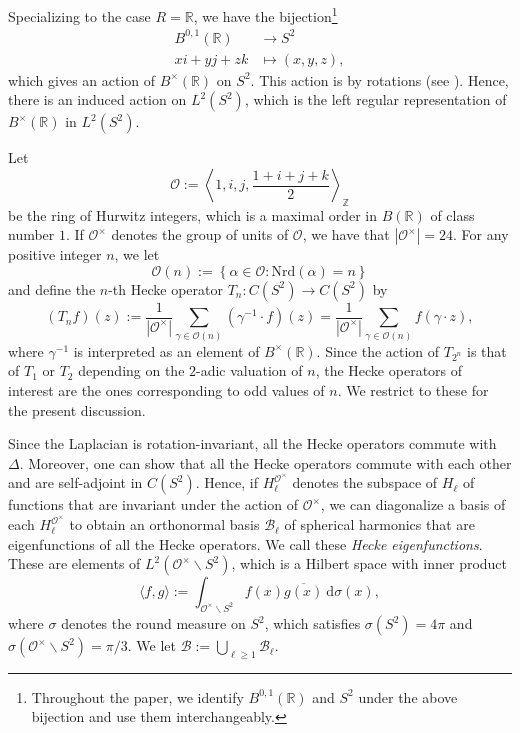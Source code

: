\documentclass[11pt]{amsart}
\theoremstyle{definition}
\begin{document}
Specializing to the case $R=\mathbb{R}$, we have the bijection\footnote{Throughout the paper, we identify $B^{0,1}(\mathbb{R})$ and $S^2$ under the above bijection and use them interchangeably.}
\begin{align*}
    B^{0,1}(\mathbb{R}) &\longrightarrow S^2 \\
    xi+yj+zk &\longmapsto (x,y,z),
\end{align*}
which gives an action of $B^{\times}(\mathbb{R})$ on $S^2$. This action is by rotations (see \cite[\S 3.1]{ConwaySmith}). Hence, there is an induced action on $L^2(S^2)$, which is the left regular representation of $B^{\times}(\mathbb{R})$ in $L^2(S^2)$. 

Let $$\mathcal{O} := \left\langle 1,i,j,\frac{1+i+j+k}{2}\right\rangle_{\mathbb{Z}}$$ be the ring of Hurwitz integers, which is a maximal order in $B(\mathbb{R})$ of class number $1$. If $\mathcal{O}^{\times}$ denotes the group of units of $\mathcal{O}$, we have that $|\mathcal{O}^{\times}| = 24$. For any positive integer $n$, we let $$ \mathcal{O}(n) := \left\{ \alpha \in \mathcal{O} : \mathrm{Nrd}(\alpha) = n \right\}$$ and define the $n$-th Hecke operator $T_n : C(S^2) \rightarrow C(S^2)$ by $$ (T_n f)(z) := \frac{1}{|\mathcal{O}^{\times}|}\sum_{\gamma \in \mathcal{O}(n)} (\gamma^{-1} \cdot f)(z) = \frac{1}{|\mathcal{O}^{\times}|}\sum_{\gamma \in \mathcal{O}(n)} f(\gamma \cdot z),$$ where $\gamma^{-1}$ is interpreted as an element of $B^{\times}(\mathbb{R})$. Since the action of $T_{2^n}$ is that of $T_1$ or $T_2$ depending on the $2$-adic valuation of $n$, the Hecke operators of interest are the ones corresponding to odd values of $n$. We restrict to these for the present discussion.

Since the Laplacian is rotation-invariant, all the Hecke operators commute with $\Delta$. Moreover, one can show that all the Hecke operators commute with each other and are self-adjoint in $C(S^2)$. Hence, if $H_{\ell}^{\mathcal{O}^{\times}}$ denotes the subspace of $H_{\ell}$ of functions that are invariant under the action of $\mathcal{O}^{\times}$, we can diagonalize a basis of each $H_{\ell}^{\mathcal{O}^{\times}}$ to obtain an orthonormal basis $\mathcal{B}_{\ell}$ of spherical harmonics that are eigenfunctions of all the Hecke operators. We call these \textit{Hecke eigenfunctions}. These are elements of $L^2(\mathcal{O}^{\times} \backslash S^2)$, which is a Hilbert space with inner product
\begin{equation}
    \langle f,g \rangle := \int_{\mathcal{O}^{\times} \backslash S^2} f(x) \overline{g(x)} \: \mathrm{d}\sigma(x), \label{innerProdbigoS2}
\end{equation}
where $\sigma$ denotes the round measure on $S^2$, which satisfies $\sigma(S^2) = 4\pi$ and $\sigma(\mathcal{O}^{\times} \backslash S^2) = \pi/3$. We let $\mathcal{B} := \bigcup_{\ell\geq 1} \mathcal{B}_{\ell}$.
\end{document}
